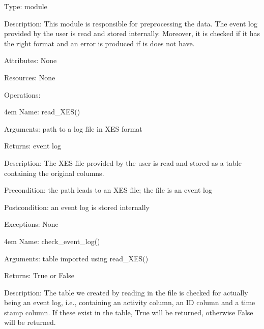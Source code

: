\documentclass[notitlepage]{article}
\begin{document}
\begin{flushleft}
Type: module

Description: This module is responsible for preprocessing the data. The event log provided by the user is read and stored internally. Moreover, it is checked if it has the right format and an error is produced if is does not have. 

Attributes: None

Resources: None

Operations: 
\medskip







\par
\endgroup

\medskip

\par
\begingroup
\leftskip4em
Name: read\_XES()

Arguments: path to a log file in XES format

Returns: event log 

Description: The XES file provided by the user is read and stored as a table containing the original columns.

Precondition: the path leads to an XES file; the file is an event log

Postcondition: an event log is stored internally

Exceptions: None
\par
\endgroup

\medskip

\par
\begingroup
\leftskip4em
Name: check\_event\_log()

Arguments: table imported using read\_XES() 

Returns: True or False

Description: The table we created by reading in the file is checked for actually being an event log, i.e., containing an activity column, an ID column and a time stamp column. If these exist in the table, True will be returned, otherwise False will be returned. 


\end{flushleft}
\end{document}
